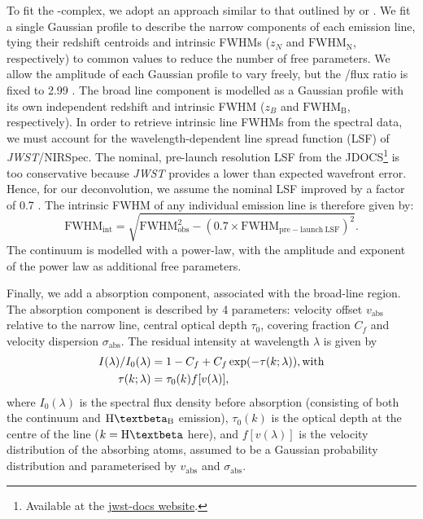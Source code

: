 \documentclass[fleqn,usenatbib]{mnras}
\newcommand{\jwst}{\textit{JWST}\xspace}
\newcommand{\Hbeta}{\text{H\textbeta}\xspace}
\begin{document}
To fit the \Hbeta-\OIIIL complex, we adopt an approach similar to that outlined by \cite{Ji2025} or \cite{Maiolino2025_QSO1}.
We fit a single Gaussian profile to describe the narrow components of each emission line, tying their redshift centroids and intrinsic FWHMs ($z_N$ and $\mathrm{FWHM}_\mathrm{N}$, respectively) to common values to reduce the number of free parameters. 
We allow the amplitude of each Gaussian profile to vary freely, but the \OIIIL/\OIIIL[4959] flux ratio is fixed to 2.99 \citep{Dimitrijevic2007}. 
The broad line component is modelled as a Gaussian profile with its own independent redshift and intrinsic FWHM ($z_B$ and $\mathrm{FWHM}_\mathrm{B}$, respectively).
In order to retrieve intrinsic line FWHMs from the spectral data, we must account for the wavelength-dependent line spread function (LSF) of \jwst/NIRSpec.
The nominal, pre-launch resolution LSF \citep{Jakobsen2022} from the JDOCS\footnote{Available at the \hyperlink{https://jwst-docs.stsci.edu/jwst-near-infrared-spectrograph/nirspec-instrumentation/nirspec-dispersers-and-filters}{jwst-docs website}.} is too conservative because \jwst provides a lower than expected wavefront error.
Hence, for our deconvolution, we assume the nominal LSF improved by a factor of 0.7 \citep[roughly in agreement with e.g.][]{Shajib2025}. 
The intrinsic FWHM of any individual emission line is therefore given by:
\begin{equation}
\mathrm{FWHM_{int}} = \sqrt{\mathrm{FWHM_{obs}^2}- (0.7\times\mathrm{FWHM_{pre-launch \ LSF}})^2}.
\label{eq:fwhm}
\end{equation}
The continuum is modelled with a power-law, with the amplitude and exponent of the power law as additional free parameters.

Finally, we add a \Hbeta absorption component, associated with the broad-line region.
The absorption component is described by 4 parameters: velocity offset $v_\mathrm{abs}$ relative to the narrow line, central optical depth $\tau_0$, covering fraction $C_f$ and velocity dispersion $\sigma_\mathrm{abs}$. 
The residual intensity at wavelength $\lambda$ is given by
\begin{equation}\label{eq:abs}
\begin{aligned}
    I(\lambda)/I_0(\lambda) &= 1 - C_f + C_f\exp(-\tau(k; \lambda)), {\rm with} \\
    \tau(k; \lambda) &= \tau_0(k)f[v(\lambda)], 
\end{aligned}
\end{equation}
where $I_0(\lambda)$ is the spectral flux density before absorption (consisting of both the continuum and $\Hbeta_\mathrm{B}$ emission), $\tau_0(k)$ is the optical depth at the centre of the line ($k = \Hbeta$ here), and $f[v(\lambda)]$ is the velocity distribution of the absorbing atoms, assumed to be a Gaussian probability distribution \cite[see e.g.][]{DEugenio2025} and parameterised by $v_\mathrm{abs}$ and $\sigma_\mathrm{abs}$.
\end{document}
